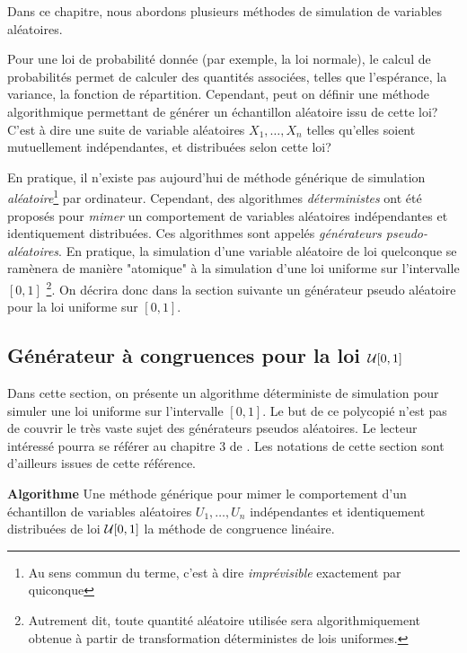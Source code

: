Dans ce chapitre, nous abordons plusieurs méthodes de simulation de variables aléatoires. 

\vspace{\baselineskip}
Pour une loi de probabilité donnée (par exemple, la loi normale), le calcul de probabilités permet de calculer des quantités associées, telles que l'espérance, la variance, la fonction de répartition.
Cependant, peut on définir une méthode algorithmique permettant de générer un échantillon aléatoire issu de cette loi? 
C'est à dire une suite de variable aléatoires $X_1, \dots, X_n$ telles qu'elles soient mutuellement indépendantes, et distribuées selon cette loi?

En pratique, il n'existe pas aujourd'hui de méthode générique de simulation \textit{aléatoire}\footnote{Au sens commun du terme, c'est à dire \textit{imprévisible} exactement par quiconque} par ordinateur. 
Cependant, des algorithmes \textit{déterministes} ont été proposés pour \textit{mimer} un comportement de variables aléatoires indépendantes et identiquement distribuées. 
Ces algorithmes sont appelés \textit{générateurs pseudo-aléatoires}. 
En pratique, la simulation d'une variable aléatoire de loi quelconque se ramènera de manière "atomique" à la simulation d'une loi uniforme sur l'intervalle $[0, 1]$ \footnote{Autrement dit, toute quantité aléatoire utilisée sera algorithmiquement obtenue à partir de transformation déterministes de lois uniformes.}. 
On décrira donc dans la section suivante un générateur pseudo aléatoire pour la loi uniforme sur $[0, 1]$.

\subsection{Générateur à congruences pour la loi $\mathcal{U}[0,1]$}
\label{sec:gen:unif}
Dans cette section, on présente un algorithme déterministe de simulation pour simuler une loi uniforme sur l'intervalle $[0,1]$. Le but de ce polycopié n'est pas de couvrir le très vaste sujet des générateurs pseudos aléatoires. Le lecteur intéressé pourra se référer au chapitre 3 de \cite{knuth1997art}. Les notations de cette section sont d'ailleurs issues de cette référence.

\vspace{\baselineskip}
\textbf{Algorithme} Une méthode générique pour mimer le comportement d'un échantillon de variables aléatoires $U_1, \dots, U_n$ indépendantes et identiquement distribuées de loi $\mathcal{U}[0,1]$ la méthode de congruence linéaire.

